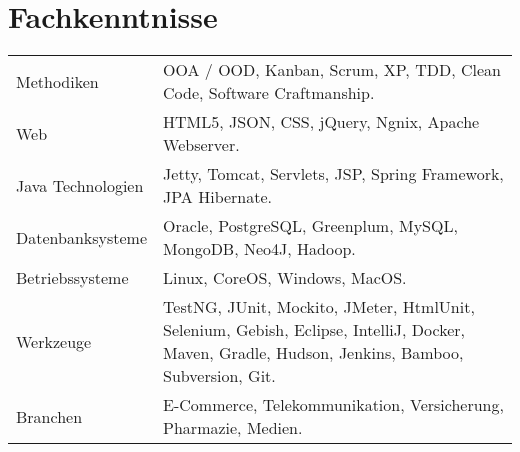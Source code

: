 \section*{Fachkenntnisse}
\begin{longtable}{@{}p{6cm}p{10cm}}
Methodiken	        & OOA / OOD, Kanban, Scrum, XP, TDD, Clean Code, Software Craftmanship.\\
Web         	    & HTML5, JSON, CSS, jQuery, Ngnix, Apache Webserver.\\
Java Technologien	& Jetty, Tomcat, Servlets, JSP, Spring Framework, JPA Hibernate.\\
Datenbanksysteme	& Oracle, PostgreSQL, Greenplum, MySQL, MongoDB, Neo4J, Hadoop.\\
Betriebssysteme	    & Linux, CoreOS, Windows, MacOS.\\
Werkzeuge		    & TestNG, JUnit, Mockito, JMeter, HtmlUnit, Selenium, Gebish, Eclipse, IntelliJ, Docker, Maven, Gradle, Hudson, Jenkins, Bamboo, Subversion, Git.\\
Branchen		    & E-Commerce, Telekommunikation, Versicherung, Pharmazie, Medien.\\
\end{longtable}
